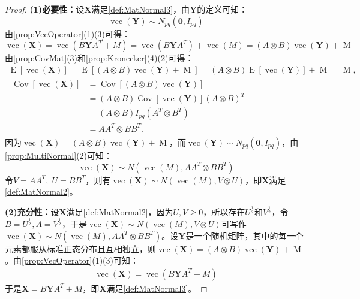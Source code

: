 \begin{proof}
	\textbf{(1)必要性：}设$\mathbf{X}$满足\cref{def:MatNormal3}，由$\mathbf{Y}$的定义可知：
	\begin{equation*}
		\operatorname{vec}(\mathbf{Y})\sim N_{pq}(\mathbf{0},I_{pq})
	\end{equation*}
	由\cref{prop:VecOperator}(1)(3)可得：
	\begin{equation*}
		\operatorname{vec}(\mathbf{X})=\operatorname{vec}(B\mathbf{Y}A^T+M)=\operatorname{vec}(B\mathbf{Y}A^T)+\operatorname{vec}(M)=(A\otimes B)\operatorname{vec}(\mathbf{Y})+\operatorname{M}
	\end{equation*}
	由\cref{prop:CovMat}(3)和\cref{prop:Kronecker}(4)(2)可得：
	\begin{gather*}
		\operatorname{E}[\operatorname{vec}(\mathbf{X})] 
		= \operatorname{E}[(A \otimes B)\operatorname{vec}(\mathbf{Y}) + \operatorname{M}] 
		= (A \otimes B)\operatorname{E}[\operatorname{vec}(\mathbf{Y})] + \operatorname{M} 
		= \operatorname{M}, \\[1ex]
		\begin{aligned}
			\operatorname{Cov}[\operatorname{vec}(\mathbf{X})] 
			&= \operatorname{Cov}[(A \otimes B)\operatorname{vec}(\mathbf{Y})] \\
			&= (A \otimes B)\operatorname{Cov}[\operatorname{vec}(\mathbf{Y})](A \otimes B)^T \\
			&= (A \otimes B)I_{pq}(A^T \otimes B^T) \\
			&= AA^T \otimes BB^T.
		\end{aligned}
	\end{gather*}
	因为$\operatorname{vec}(\mathbf{X})=(A\otimes B)\operatorname{vec}(\mathbf{Y})+\operatorname{M}$，而$\operatorname{vec}(\mathbf{Y})\sim N_{pq}(\mathbf{0},I_{pq})$，由\cref{prop:MultiNormal}(2)可知：
	\begin{equation*}
		\operatorname{vec}(\mathbf{X})\sim N(\operatorname{vec}(M),AA^T\otimes BB^T)
	\end{equation*}
	令$V=AA^T,\;U=BB^T$，则有$\operatorname{vec}(\mathbf{X})\sim N(\operatorname{vec}(M),V\otimes U)$，即$\mathbf{X}$满足\cref{def:MatNormal2}。\par
	\textbf{(2)充分性：}设$\mathbf{X}$满足\cref{def:MatNormal2}，因为$U,V\geqslant0$，所以存在$U^{\frac{1}{2}}$和$V^{\frac{1}{2}}$，令$B=U^{\frac{1}{2}},A=V^{\frac{1}{2}}$，于是$\operatorname{vec}(\mathbf{X})\sim N(\operatorname{vec}(M),V\otimes U)$可写作$\operatorname{vec}(\mathbf{X})\sim N(\operatorname{vec}(M),AA^T\otimes BB^T)$。设$\mathbf{Y}$是一个随机矩阵，其中的每一个元素都服从标准正态分布且互相独立，则$\operatorname{vec}(\mathbf{X})=(A\otimes B)\operatorname{vec}(\mathbf{Y})+\operatorname{M}$。由\cref{prop:VecOperator}(1)(3)可知：
	\begin{gather*}
		\operatorname{vec}(\mathbf{X})=\operatorname{vec}(B\mathbf{Y}A^T+M)
	\end{gather*}
	于是$\mathbf{X}=B\mathbf{Y}A^T+M$，即$\mathbf{X}$满足\cref{def:MatNormal3}。
\end{proof}
